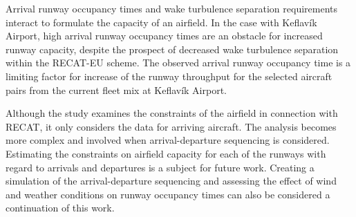 Arrival runway occupancy times and wake turbulence separation requirements interact to formulate the capacity of an airfield. In the case with Keflavík Airport, high arrival runway occupancy times are an obstacle for increased runway capacity, despite the prospect of decreased wake turbulence separation within the RECAT-EU scheme. The observed arrival runway occupancy time is a limiting factor for increase of the runway throughput for the selected aircraft pairs from the current fleet mix at Keflavík Airport.

Although the study examines the constraints of the airfield in connection with RECAT, it only considers the data for arriving aircraft. The analysis becomes more complex and involved when arrival-departure sequencing is considered. Estimating the constraints on airfield capacity for each of the runways with regard to arrivals and departures is a subject for future work. Creating a simulation of the arrival-departure sequencing and assessing the effect of wind and weather conditions on runway occupancy times can also be considered a continuation of this work.



